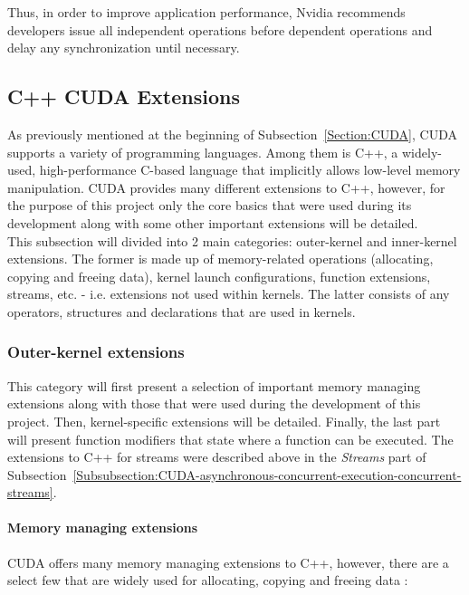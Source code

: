 Thus, in order to improve application performance, Nvidia recommends developers issue all independent operations before dependent operations and delay any synchronization until necessary.


\subsection{C++ CUDA Extensions \TO}\label{Subsection:CUDA-C++-extensions}
As previously mentioned at the beginning of Subsection~\ref{Section:CUDA}, CUDA supports a variety of programming languages. Among them is C++, a widely-used, high-performance C-based language that implicitly allows low-level memory manipulation. CUDA provides many different extensions to C++, however, for the purpose of this project only the core basics that were used during its development along with some other important extensions will be detailed. \\
This subsection will divided into 2 main categories: outer-kernel and inner-kernel extensions. The former is made up of memory-related operations (allocating, copying and freeing data), kernel launch configurations, function extensions, streams, etc. - i.e. extensions not used within kernels. The latter consists of any operators, structures and declarations that are used in kernels.

\subsubsection{Outer-kernel extensions}\label{Subsubsection:CUDA-C++-extensions-outer-kernel-extensions}
This category will first present a selection of important memory managing extensions along with those that were used during the development of this project. Then, kernel-specific extensions will be detailed. Finally, the last part will present function modifiers that state where a function can be executed. The extensions to C++ for streams were described above in the \textit{Streams} part of Subsection~\ref{Subsubsection:CUDA-asynchronous-concurrent-execution-concurrent-streams}.

\paragraph{Memory managing extensions}\label{Paragraph:CUDA-C++-extensions-outer-kernel-extensions-memory-managing-extensions}
CUDA offers many memory managing extensions to C++, however, there are a select few that are widely used for allocating, copying and freeing data \cite{NVIDIAMay2022, NvidiaJanuary2022, Cejka2020}:

